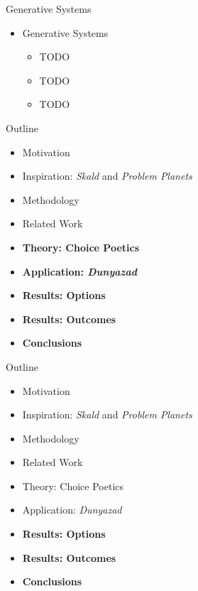 \documentclass[xcolor=x11names]{beamer}
\def\dunyazad/{\textit{Dunyazad}}
\def\skald/{\textit{Skald}}
\def\problemplanets/{\textit{Problem Planets}}
\begin{document}
\begin{frame}{Generative Systems}
  \begin{itemize}\addtolength{\itemsep}{0.5\baselineskip}
    \item Generative Systems
    \begin{itemize}\addtolength{\itemsep}{0.5\baselineskip}
      \vspace{0.5\baselineskip}
      \item TODO
      \item TODO
      \item TODO
    \end{itemize}
  \end{itemize}
\end{frame}

\begin{frame}{Outline}
  \begin{itemize}
    \item Motivation
    \item Inspiration: \skald/ and \problemplanets/
    \item Methodology
    \item Related Work
    \item \textbf{Theory: Choice Poetics}
    \item \textbf{Application: \dunyazad/}
    \item \textbf{Results: Options}
    \item \textbf{Results: Outcomes}
    \item \textbf{Conclusions}
  \end{itemize}
\end{frame}

\begin{frame}{Outline}
  \begin{itemize}
    \item Motivation
    \item Inspiration: \skald/ and \problemplanets/
    \item Methodology
    \item Related Work
    \item Theory: Choice Poetics
    \item Application: \dunyazad/
    \item \textbf{Results: Options}
    \item \textbf{Results: Outcomes}
    \item \textbf{Conclusions}
  \end{itemize}
\end{frame}
\end{document}
